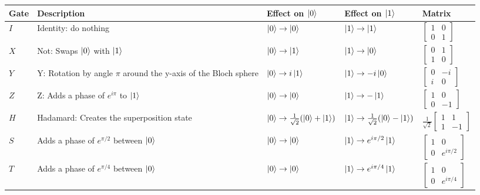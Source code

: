\documentclass{book}
\begin{document}
\begin{center}
\begin{tabular}{||m{1cm}| m{5cm} | m{3cm} | m{3cm} | m{2cm}||} 
 \hline
 Gate & Description & Effect on $\ket{0}$ & Effect on $\ket{1}$ & Matrix \\ [0.5ex] 
 \hline\hline
 $I$ & Identity: do nothing & $\ket{0} \rightarrow  \ket{0} $ & $\ket{1} \rightarrow \ket{1}$ & $\begin{bmatrix} 1 & 0 \\ 0 & 1 \end{bmatrix}$ \\ 
 \hline
 $X$ & Not: Swaps $\ket{0}$ with $\ket{1}$   &$\ket{0} \rightarrow \ket{1}$ &$\ket{1} \rightarrow  \ket{0}$ & $\begin{bmatrix} 0 & 1 \\ 1 & 0 \end{bmatrix}$ \\
 \hline
 $Y$ & Y: Rotation by angle $\pi$ around the y-axis of the Bloch sphere & $\ket{0} \rightarrow  i\ket{1} $ & $\ket{1} \rightarrow -i\ket{0} $ & $\begin{bmatrix} 0 & -i \\ i & 0 \end{bmatrix}$ \\
 \hline
 $Z$ & Z: Adds a phase of $e^{i\pi}$ to $\ket{1}$&$\ket{0} \rightarrow \ket{0}$&$\ket{1} \rightarrow -\ket{1}$ &$\begin{bmatrix} 1 & 0 \\ 0 & -1 \end{bmatrix}$  \\
 \hline
 $H$ & Hadamard: Creates the superposition state & $\ket{0} \rightarrow \frac{1}{\sqrt{2}} ( \ket{0} + \ket{1})$ & $\ket{1} \rightarrow \frac{1}{\sqrt{2}} ( \ket{0} - \ket{1})$ & $\frac{1}{\sqrt{2}}\begin{bmatrix} 1 & 1 \\ 1 & -1 \end{bmatrix} $\\
 \hline
 $S$ & Adds a phase of $e^{\pi/2}$ between $\ket{0}$ &$\ket{0} \rightarrow  \ket{0} $ &$\ket{1} \rightarrow e^{i\pi/2}\ket{1}$  & $\begin{bmatrix} 1 & 0 \\ 0 & e^{i\pi/2} \end{bmatrix}$\\
 \hline
 $T$ & Adds a phase of $e^{\pi/4}$ between $\ket{0}$ &  $\ket{0} \rightarrow  \ket{0} $& $\ket{1} \rightarrow e^{i\pi/4}\ket{1}$ & $\begin{bmatrix} 1 & 0 \\ 0 & e^{i\pi/4} \end{bmatrix}$\\ [1ex] 
 \hline
\end{tabular}
\end{center}
\end{document}
